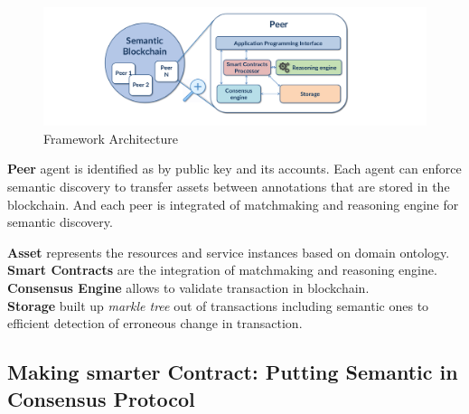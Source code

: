 \begin{center}
	\begin{figure}[htb!]
		
		\begin{minipage}{0.55\linewidth}
			\centering
			\includegraphics[width=1.95\textwidth]{images/chap02_PeerBlockchain.png}
		\end{minipage}
		\caption[Framework Arciteture]{Framework Architecture \cite{Ruta}}
		
	\end{figure}
	
\end{center}


\textbf{Peer} agent is identified as by public key and its accounts. Each agent can enforce semantic discovery to transfer assets between annotations that are stored in the blockchain. And each peer is integrated of matchmaking and reasoning engine for semantic discovery.

\textbf{Asset} represents the resources and service instances based on domain ontology.\\
\textbf{Smart Contracts} are the integration of matchmaking and reasoning engine.\\
\textbf{Consensus Engine} allows to validate transaction in blockchain.\\
\textbf{Storage} built up  \textit{markle tree} out of transactions including semantic ones to efficient detection of erroneous change in transaction\cite{Ruta}.

\subsection{Making smarter Contract: Putting Semantic in Consensus Protocol}


